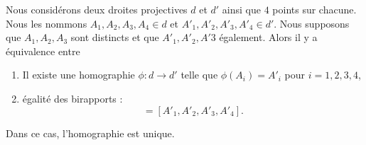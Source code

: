 \begin{proposition}      \label{PROPooMGYDooHqSoJs}
    Nous considérons deux droites projectives \( d\) et \( d'\) ainsi que \( 4\) points sur chacune. Nous les nommons \( A_1,A_2,A_3,A_4\in d\) et \( A'_1,A'_2,A'_3,A'_4\in d'\). Nous supposons que \( A_1,A_2,A_3\) sont distincts et que \( A'_1,A'_2,A'3\) également. Alors il y a équivalence entre
    \begin{enumerate}
        \item       \label{ITEMooIDKBooXHnNDi}
            Il existe une homographie \( \phi\colon d\to d'\) telle que \( \phi(A_i)=A'_i\) pour \( i=1,2,3,4\),
        \item       \label{ITEMooCDWAooIckJwT}
            égalité des birapports :
            \begin{equation}
                [A_1,A_2,A_3,A_4]=[A'_1,A'_2,A'_3,A'_4].
            \end{equation}
    \end{enumerate}
    Dans ce cas, l'homographie est unique.
\end{proposition}

